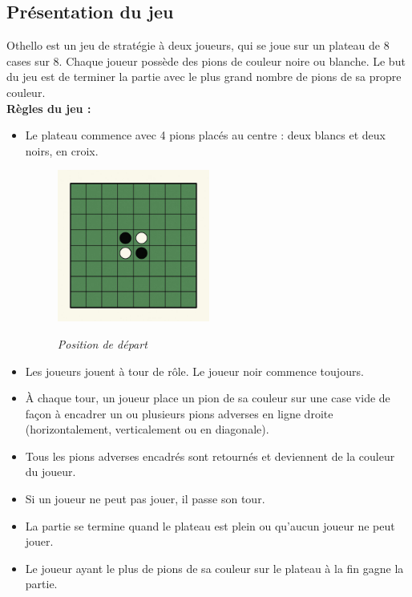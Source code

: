 \documentclass[12pt, a4paper, oneside]{article}
\begin{document}
    \subsection{Présentation du jeu}
    Othello est un jeu de stratégie à deux joueurs, qui se joue sur un plateau de 8 cases sur 8. Chaque joueur possède des pions de couleur noire ou blanche. Le but du jeu est de terminer la partie avec le plus grand nombre de pions de sa propre couleur. \\
    \textbf{Règles du jeu :}
    \begin{itemize}
        \item Le plateau commence avec 4 pions placés au centre : deux blancs et deux noirs, en croix.
        \begin{figure}[h]
            \begin{center}
            \includegraphics[height=5cm]{othello_depart_position.jpg}\\
            \caption{\textit{Position de départ}}
            \end{center}
            \end{figure}
        \item Les joueurs jouent à tour de rôle. Le joueur noir commence toujours.
        \item À chaque tour, un joueur place un pion de sa couleur sur une case vide de façon à encadrer un ou plusieurs pions adverses en ligne droite (horizontalement, verticalement ou en diagonale).
        \item Tous les pions adverses encadrés sont retournés et deviennent de la couleur du joueur.
        \item Si un joueur ne peut pas jouer, il passe son tour.
        \item La partie se termine quand le plateau est plein ou qu’aucun joueur ne peut jouer.
        \item Le joueur ayant le plus de pions de sa couleur sur le plateau à la fin gagne la partie.
    \end{itemize}    
\end{document}
